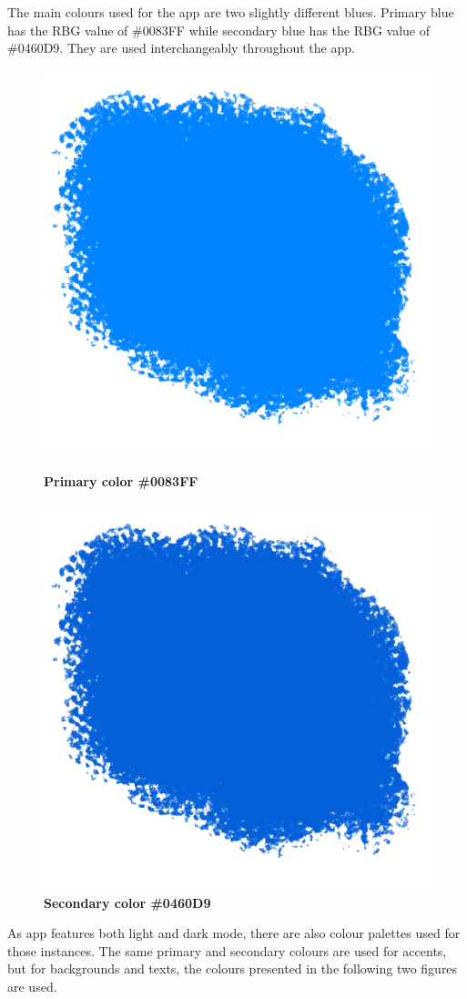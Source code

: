 The main colours used for the app are two slightly different blues. Primary blue has the RBG value of \#0083FF while secondary blue has the RBG value of \#0460D9. They are used interchangeably throughout the app.
\begin{figure}[!htb]
\centering
\begin{minipage}{.45\textwidth}
\centering
\includegraphics[width=.5\textwidth]{../Images/UI/primaryColor.png}
\caption{\label{fig:dbapiuser}\textbf{Primary color \#0083FF}}
\end{minipage} 
\begin{minipage}{.45\textwidth}
\centering
\includegraphics[width=.5\textwidth]{../Images/UI/secondaryColor.png}
\caption{\label{fig:dbapiuser}\textbf{Secondary color \#0460D9}}
\end{minipage}
\end{figure} 

As app features both light and dark mode, there are also colour palettes used for those instances. The same primary and secondary colours are used for accents, but for backgrounds and texts, the colours presented in the following two figures are used. 

